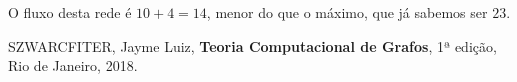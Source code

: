 \documentclass{homework}
\begin{document}
		
	
	O fluxo desta rede é $10 + 4 = 14$, menor do que o máximo, que já sabemos ser $23$.
	
	
	\begin{thebibliography}{10}
		 SZWARCFITER, Jayme Luiz, \textbf{Teoria Computacional de Grafos}, 1ª edição, Rio de Janeiro, 2018.
	\end{thebibliography}
	\newpage
	\let\clearpage\relax
\end{document}

